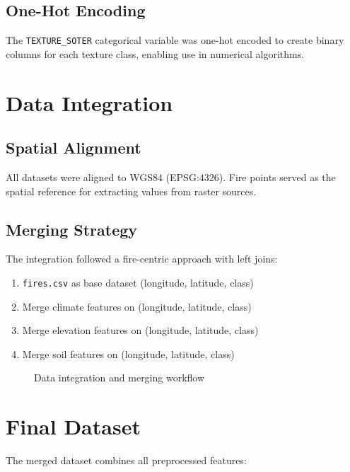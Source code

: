 \subsection{One-Hot Encoding}
The \texttt{TEXTURE\_SOTER} categorical variable was one-hot encoded to create binary columns for each texture class, enabling use in numerical algorithms.

\section{Data Integration}

\subsection{Spatial Alignment}
All datasets were aligned to WGS84 (EPSG:4326). Fire points served as the spatial reference for extracting values from raster sources.

\subsection{Merging Strategy}
The integration followed a fire-centric approach with left joins:
\begin{enumerate}
    \item \texttt{fires.csv} as base dataset (longitude, latitude, class)
    \item Merge climate features on (longitude, latitude, class)
    \item Merge elevation features on (longitude, latitude, class)
    \item Merge soil features on (longitude, latitude, class)
\end{enumerate}

\begin{figure}[H]
    \centering
    \caption{Data integration and merging workflow}
    \label{fig:merging_flowchart}
\end{figure}

\section{Final Dataset}

The merged dataset combines all preprocessed features:

